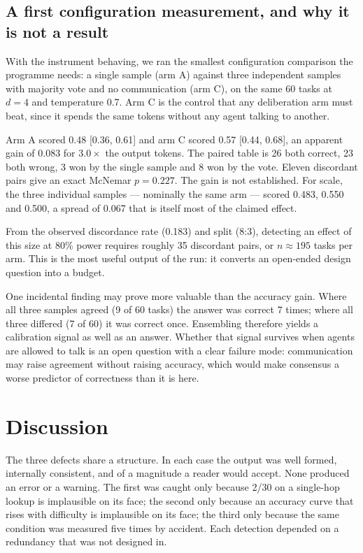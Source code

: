 \documentclass[10pt,twocolumn]{article}
\begin{document}
\subsection{A first configuration measurement, and why it is not a result}

With the instrument behaving, we ran the smallest configuration comparison the programme needs: a
single sample (arm A) against three independent samples with majority vote and no communication
(arm C), on the same 60 tasks at $d{=}4$ and temperature 0.7. Arm C is the control that any
deliberation arm must beat, since it spends the same tokens without any agent talking to another.

Arm A scored 0.48 [0.36, 0.61] and arm C scored 0.57 [0.44, 0.68], an apparent gain of 0.083 for
$3.0\times$ the output tokens. The paired table is 26 both correct, 23 both wrong, 3 won by the
single sample and 8 won by the vote. Eleven discordant pairs give an exact McNemar $p = 0.227$.
The gain is not established. For scale, the three individual samples --- nominally the same arm ---
scored 0.483, 0.550 and 0.500, a spread of 0.067 that is itself most of the claimed effect.

From the observed discordance rate (0.183) and split (8:3), detecting an effect of this size at 80\%
power requires roughly 35 discordant pairs, or $n \approx 195$ tasks per arm. This is the most
useful output of the run: it converts an open-ended design question into a budget.

One incidental finding may prove more valuable than the accuracy gain. Where all three samples
agreed (9 of 60 tasks) the answer was correct 7 times; where all three differed (7 of 60) it was
correct once. Ensembling therefore yields a calibration signal as well as an answer. Whether that
signal survives when agents are allowed to talk is an open question with a clear failure mode:
communication may raise agreement without raising accuracy, which would make consensus a worse
predictor of correctness than it is here.

\section{Discussion}

The three defects share a structure. In each case the output was well formed, internally consistent,
and of a magnitude a reader would accept. None produced an error or a warning. The first was caught
only because 2/30 on a single-hop lookup is implausible on its face; the second only because an
accuracy curve that rises with difficulty is implausible on its face; the third only because the
same condition was measured five times by accident. Each detection depended on a redundancy that was
not designed in.
\end{document}
